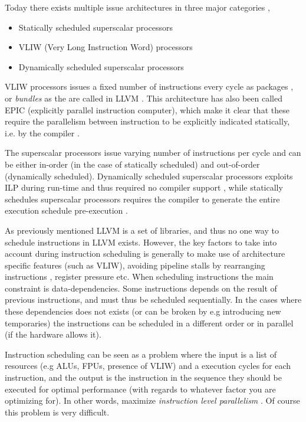 Today there exists multiple issue architectures in three major categories \cite[Section~3.7]{caqa},

\begin{itemize}
	\item Statically scheduled superscalar processors
	\item VLIW (Very Long Instruction Word) processors
	\item Dynamically scheduled superscalar processors
\end{itemize}

VLIW processors issues a fixed number of instructions every cycle as packages \cite[Section~3.7]{caqa},
or \textit{bundles} as the are called in LLVM \cite{llvm-codegenerator-bundles}. This
architecture has also been called EPIC (explicitly parallel instruction computer), which
make it clear that these require the parallelism between instruction to be explicitly
indicated statically, i.e. by the compiler \cite[Section~3.7]{caqa}.

The superscalar processors issue varying number of instructions per cycle and can be either
in-order (in the case of statically scheduled) and out-of-order (dynamically scheduled).
Dynamically scheduled superscalar processors exploits ILP during run-time and thus required
no compiler support \cite[Section~3.4]{caqa}, while statically schedules superscalar
processors requires the compiler to generate the entire execution schedule pre-execution
\cite[Section~3.7]{caqa}.

As previously mentioned LLVM is a set of libraries, and thus no one way to schedule instructions
in LLVM exists. However, the key factors to take into account during instruction scheduling
is generally to make use of architecture specific features (such as VLIW), avoiding pipeline
stalls by rearranging instructions \cite[Section~3.2]{caqa}, register pressure
\cite{llvm-inst-sched-superscalar-vliw} etc. When scheduling instructions the main
constraint is data-dependencies. Some instructions depends on the result of previous
instructions, and must thus be scheduled sequentially. In the cases where these
dependencies does not exists (or can be broken by e.g introducing new temporaries) the
instructions can be scheduled in a different order or in parallel (if the hardware allows it).

Instruction scheduling can be seen as a problem where the input is a list of resources
(e.g ALUs, FPUs, presence of VLIW) and a execution cycles for each instruction, and the
output is the instruction in the sequence they should be executed for optimal performance
(with regards to whatever factor you are optimizing for). In other words, maximize
\textit{instruction level parallelism} \cite{inst-sched-cmu}. Of course this problem is
very difficult.

